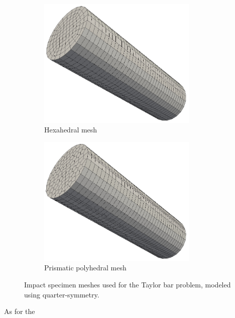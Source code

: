 \begin{figure}[!h]
  \centering
    \begin{subfigure}[b]{0.49\linewidth}
            \centering
            \includegraphics[width=3.0in]{figures/taylor_bar_hex_mesh.pdf}
    			\caption{Hexahedral mesh \label{fig:taylor_bar_hex_mesh}}
    \end{subfigure}
	\begin{subfigure}[b]{0.49\linewidth}
            \centering
            \includegraphics[width=3.0in]{figures/taylor_bar_poly_mesh.pdf}
    			\caption{Prismatic polyhedral mesh \label{fig:taylor_bar_poly_mesh}}
    \end{subfigure} \caption{Impact specimen meshes used for the Taylor bar problem, modeled using quarter-symmetry.}
  \label{fig:taylor_bar_meshes}
\end{figure}

As for the 

